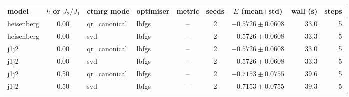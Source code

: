 \begin{tabular}{l c l l c c c r r}
\toprule
model & $h$ or $J_2/J_1$ & ctmrg mode & optimiser & metric & seeds & $E$ (mean$\pm$std) & wall (s) & steps \\
\midrule
heisenberg & 0.00 & qr\_canonical & lbfgs & -- & 2 & $-0.5726 \pm 0.0608$ & 33.0 & 5 \\
heisenberg & 0.00 & svd & lbfgs & -- & 2 & $-0.5726 \pm 0.0608$ & 33.3 & 5 \\
j1j2 & 0.00 & qr\_canonical & lbfgs & -- & 2 & $-0.5726 \pm 0.0608$ & 33.0 & 5 \\
j1j2 & 0.00 & svd & lbfgs & -- & 2 & $-0.5726 \pm 0.0608$ & 33.3 & 5 \\
j1j2 & 0.50 & qr\_canonical & lbfgs & -- & 2 & $-0.7153 \pm 0.0755$ & 39.6 & 5 \\
j1j2 & 0.50 & svd & lbfgs & -- & 2 & $-0.7153 \pm 0.0755$ & 39.3 & 5 \\
\bottomrule
\end{tabular}
